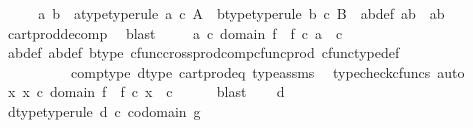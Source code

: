 \begin{isabellebody}
\ \ \isamarkupfalse%
\ \isamarkupfalse%
\ a\ b\ \ a{\isacharunderscore}{\kern0pt}type{\isacharbrackleft}{\kern0pt}type{\isacharunderscore}{\kern0pt}rule{\isacharbrackright}{\kern0pt}{\isacharcolon}{\kern0pt}\ {\isachardoublequoteopen}a\ {\isasymin}\isactrlsub c\ A{\isachardoublequoteclose}\ \ b{\isacharunderscore}{\kern0pt}type{\isacharbrackleft}{\kern0pt}type{\isacharunderscore}{\kern0pt}rule{\isacharbrackright}{\kern0pt}{\isacharcolon}{\kern0pt}\ {\isachardoublequoteopen}b\ {\isasymin}\isactrlsub c\ B{\isachardoublequoteclose}\ \ ab{\isacharunderscore}{\kern0pt}def{}{\isacharcolon}{\kern0pt}\ {\isachardoublequoteopen}ab\ {\isacharequal}{\kern0pt}\ {\isasymlangle}a{\isacharcomma}{\kern0pt}b{\isasymrangle}{\isachardoublequoteclose}\isanewline
\ \ \ \ \isamarkupfalse%
\ cart{\isacharunderscore}{\kern0pt}prod{\isacharunderscore}{\kern0pt}decomp\ \isamarkupfalse%
\ blast\isanewline
\ \ \isamarkupfalse%
\ \ {\isachardoublequoteopen}a\ {\isasymin}\isactrlsub c\ domain\ f\ {\isasymand}\ f\ {\isasymcirc}\isactrlsub c\ a\ {\isacharequal}{\kern0pt}\ c{\isachardoublequoteclose}\isanewline
\ \ \ \ \isamarkupfalse%
\ ab{\isacharunderscore}{\kern0pt}def\ ab{\isacharunderscore}{\kern0pt}def{}\ b{\isacharunderscore}{\kern0pt}type\ cfunc{\isacharunderscore}{\kern0pt}cross{\isacharunderscore}{\kern0pt}prod{\isacharunderscore}{\kern0pt}comp{\isacharunderscore}{\kern0pt}cfunc{\isacharunderscore}{\kern0pt}prod\ cfunc{\isacharunderscore}{\kern0pt}type{\isacharunderscore}{\kern0pt}def\isanewline
\ \ \ \ \ \ \ \ \ \ comp{\isacharunderscore}{\kern0pt}type\ d{\isacharunderscore}{\kern0pt}type\ cart{\isacharunderscore}{\kern0pt}prod{\isacharunderscore}{\kern0pt}eq{}\ type{\isacharunderscore}{\kern0pt}assms\ \isamarkupfalse%
\ {\isacharparenleft}{\kern0pt}typecheck{\isacharunderscore}{\kern0pt}cfuncs{\isacharcomma}{\kern0pt}\ auto{\isacharparenright}{\kern0pt}\isanewline
\ \ \isamarkupfalse%
\ \isamarkupfalse%
\ {\isachardoublequoteopen}{\isasymexists}x{\isachardot}{\kern0pt}\ x\ {\isasymin}\isactrlsub c\ domain\ f\ {\isasymand}\ f\ {\isasymcirc}\isactrlsub c\ x\ {\isacharequal}{\kern0pt}\ c{\isachardoublequoteclose}\isanewline
\ \ \ \ \isamarkupfalse%
\ blast\isanewline
{}\isamarkupfalse%
\isanewline
\ \ \isamarkupfalse%
\ d\ \isanewline
\ \ \isamarkupfalse%
\ d{\isacharunderscore}{\kern0pt}type{\isacharbrackleft}{\kern0pt}type{\isacharunderscore}{\kern0pt}rule{\isacharbrackright}{\kern0pt}{\isacharcolon}{\kern0pt}\ {\isachardoublequoteopen}d\ {\isasymin}\isactrlsub c\ codomain\ g{\isachardoublequoteclose}\isanewline

\end{isabellebody}
